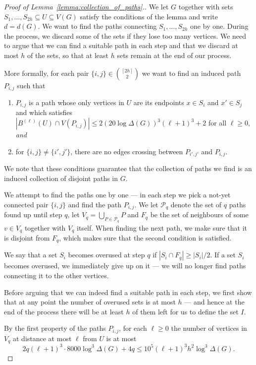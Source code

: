 \documentclass[10pt, a4paper]{article}
\numberwithin{theorem}{section} %
\theoremstyle{remark}
\theoremstyle{definition}
\begin{document}
\begin{proof}[Proof of Lemma~\ref{lemma:collection_of_paths}.]
    We let $G$ together with sets $S_1, \dots, S_{2h} \subseteq U \subseteq V(G)$ satisfy the conditions of the lemma and write $d = d(G)$.
    We want to find the paths connecting $S_1, \dots, S_{2h}$ one by one.
    During the process, we discard some of the sets if they lose too many vertices.
    We need to argue that we can find a suitable path in each step and that we discard at most $h$ of the sets, so that at least $h$ sets remain at the end of our process.

    More formally, for each pair $\{i, j\} \in \binom{[2h]}{2}$ we want to find an induced path $P_{i,j}$ such that
    \begin{enumerate}
        \item $P_{i, j}$ is a path whose only vertices in $U$ are its endpoints $x \in S_i$ and $x' \in S_j$ and which satisfies $|B^{(\ell)}(U)\cap V(P_{i, j})|\leq 2(20\log \Delta(G))^3 (\ell+1)^3+2$ for all $\ell\geq 0$, \emph{and}
        \item for $\{i, j\} \neq \{i', j'\}$, there are no edges crossing between $P_{i', j'}$ and $P_{i, j}$.
    \end{enumerate}
    We note that these conditions guarantee that the collection of paths we find is an induced collection of disjoint paths in $G$.

    We attempt to find the paths one by one --- in each step we pick a not-yet connected pair $\{i, j\}$ and find the path $P_{i, j}$.
    We let $\mathcal{P}_q$ denote the set of $q$ paths found up until step $q$, let $V_q = \bigcup_{P \in \mathcal{P}_q} P$ and $F_q$ be the set of neighbours of some $v\in V_q$ together with $V_q$ itself. When finding the next path, we make sure that it is disjoint from $F_q$, which makes sure that the second condition is satisfied.

    We say that a set $S_i$ becomes overused at step $q$ if $|S_i \cap F_q| \geq |S_i|/2$. If a set $S_i$ becomes overused, we immediately give up on it --- we will no longer find paths connecting it to the other vertices.

    Before arguing that we can indeed find a suitable path in each step, we first show that at any point the number of overused sets is at most $h$ --- and hence at the end of the process there will be at least $h$ of them left for us to define the set $I$.

    By the first property of the paths $P_{i, j}$, for each $\ell \geq 0$ the number of vertices in $V_q$ at distance at most $\ell$ from $U$ is at most
    \[
        2q(\ell+1)^3  \cdot 8000\log^3\Delta(G)  + 4q \leq 10^5(\ell+1)^3h^2\log^3\Delta(G).
    \]
    

\end{proof}
\end{document}
